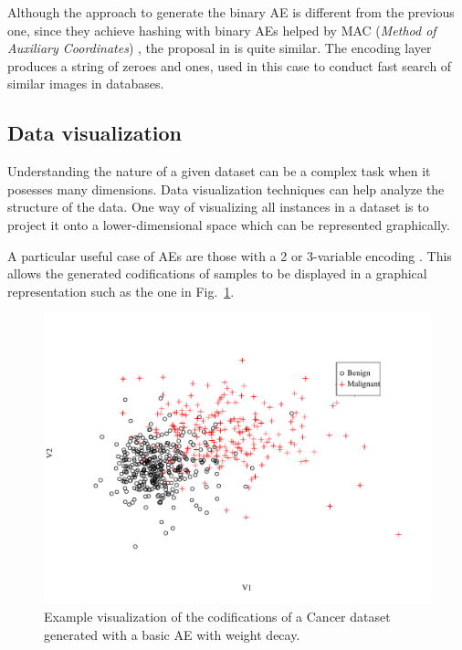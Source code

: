 Although the approach to generate the binary AE is different from the previous one, since they achieve hashing with binary AEs helped by MAC (\textit{Method of Auxiliary Coordinates}) , the proposal in  is quite similar. The encoding layer produces a string of zeroes and ones, used in this case to conduct fast search of similar images in databases.

\subsection{Data visualization}\label{p1Sec.Visualization}

Understanding the nature of a given dataset can be a complex task when it posesses many dimensions. Data visualization techniques  can help analyze the structure of the data. One way of visualizing all instances in a dataset is to project it onto a lower-dimensional space which can be represented graphically.

A particular useful case of AEs are those with a 2 or 3-variable encoding . This allows the generated codifications of samples to be displayed in a graphical representation such as the one in Fig.~\ref{p1Fig.Cancer}.

\begin{figure}[h!]
  \centering
  \includegraphics[width=.95\linewidth]{cancer_2var.pdf}
  \caption{\label{p1Fig.Cancer}Example visualization of the codifications of a Cancer dataset generated with a basic AE with weight decay.}
\end{figure}


